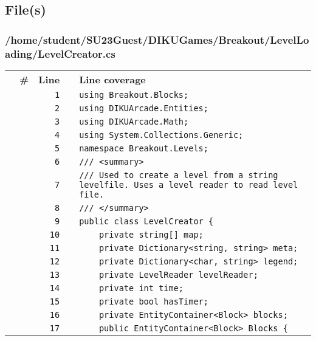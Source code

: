 \documentclass[a4paper,landscape,10pt]{article}
\begin{document}
\subsection{File(s)}
\subsubsection{/home/student/SU23Guest/DIKUGames/Breakout/LevelLoading/LevelCreator.cs}
\begin{longtable}[l]{lrrll}
\textbf{} & \textbf{\#} & \textbf{Line} & \textbf{} & \textbf{Line coverage}\\
\cellcolor{gray} &  & \verb~1~ & & \verb~using Breakout.Blocks;~\\
\cellcolor{gray} &  & \verb~2~ & & \verb~using DIKUArcade.Entities;~\\
\cellcolor{gray} &  & \verb~3~ & & \verb~using DIKUArcade.Math;~\\
\cellcolor{gray} &  & \verb~4~ & & \verb~using System.Collections.Generic;~\\
\cellcolor{gray} &  & \verb~5~ & & \verb~namespace Breakout.Levels;~\\
\cellcolor{gray} &  & \verb~6~ & & \verb~/// <summary>~\\
\cellcolor{gray} &  & \verb~7~ & & \verb~/// Used to create a level from a string levelfile. Uses a level reader to read level file.~\\
\cellcolor{gray} &  & \verb~8~ & & \verb~/// </summary>~\\
\cellcolor{gray} &  & \verb~9~ & & \verb~public class LevelCreator {~\\
\cellcolor{gray} &  & \verb~10~ & & \verb~    private string[] map;~\\
\cellcolor{gray} &  & \verb~11~ & & \verb~    private Dictionary<string, string> meta;~\\
\cellcolor{gray} &  & \verb~12~ & & \verb~    private Dictionary<char, string> legend;~\\
\cellcolor{gray} &  & \verb~13~ & & \verb~    private LevelReader levelReader;~\\
\cellcolor{gray} &  & \verb~14~ & & \verb~    private int time;~\\
\cellcolor{gray} &  & \verb~15~ & & \verb~    private bool hasTimer;~\\
\cellcolor{gray} &  & \verb~16~ & & \verb~    private EntityContainer<Block> blocks;~\\
\cellcolor{gray} &  & \verb~17~ & & \verb~    public EntityContainer<Block> Blocks {~\\

\end{longtable}
\end{document}
